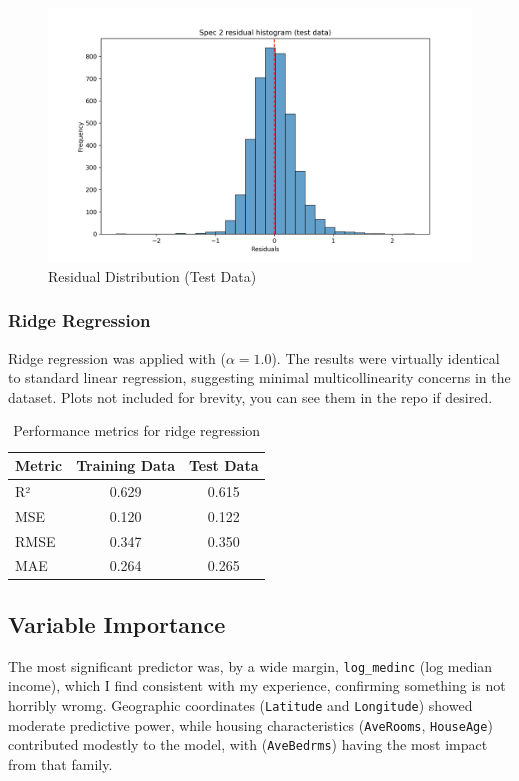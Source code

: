 \documentclass[letterpaper, 11pt]{amsart}
\begin{document}
\begin{figure}[h]
\centering
\includegraphics[width=0.8\linewidth]{plots/Spec_2_residual_hist_test.png}
\caption{Residual Distribution (Test Data)}
\end{figure}

\subsubsection{Ridge Regression}
Ridge regression was applied with ($\alpha=1.0$). The results were virtually identical to standard linear regression, suggesting minimal multicollinearity concerns in the dataset. Plots not included for brevity, you can see them in the repo if desired.

\begin{table}[h]
\centering
\begin{tabular}{lcc}
\hline
Metric & Training Data & Test Data \\
\hline
R² & 0.629 & 0.615 \\
MSE & 0.120 & 0.122 \\
RMSE & 0.347 & 0.350 \\
MAE & 0.264 & 0.265 \\
\hline
\end{tabular}
\caption{Performance metrics for ridge regression}
\end{table}

\subsection{Variable Importance}
The most significant predictor was, by a  wide margin, \texttt{log\_medinc} (log median income), which I find consistent with my experience, confirming something is not horribly wromg. Geographic coordinates (\texttt{Latitude} and \texttt{Longitude}) showed moderate predictive power, while housing characteristics (\texttt{AveRooms}, \texttt{HouseAge}) contributed modestly to the model, with (\texttt{AveBedrms}) having the most impact from that family.
\end{document}
